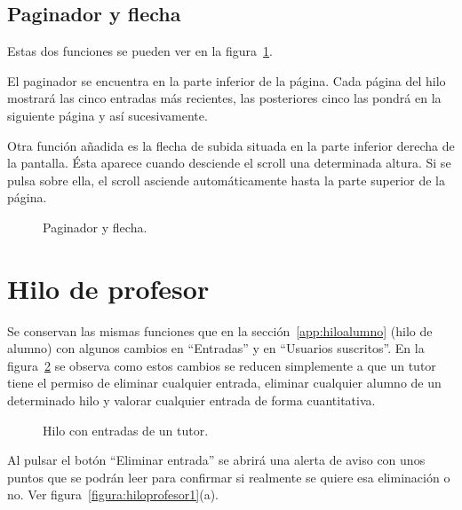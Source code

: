 \documentclass[a4paper, 12pt]{book}
\begin{document}
\subsection{Paginador y flecha}
Estas dos funciones se pueden ver en la figura~\ref{figura:hiloalumno5}.

El paginador se encuentra en la parte inferior de la p\'agina. Cada p\'agina del hilo mostrar\'a las cinco entradas m\'as recientes, las posteriores cinco 
las pondr\'a en la siguiente p\'agina y as\'i sucesivamente.

Otra funci\'on a\~nadida es la flecha de subida situada en la parte inferior derecha de la pantalla. \'Esta aparece cuando desciende el scroll una 
determinada altura. Si se pulsa sobre ella, el scroll asciende autom\'aticamente hasta la parte superior de la p\'agina.
\begin{figure}[htbp] 
  \centering
  \caption{Paginador y flecha.}
  \label{figura:hiloalumno5}
\end{figure}

\section{Hilo de profesor}
Se conservan las mismas funciones que en la secci\'on~\ref{app:hiloalumno} (hilo de alumno) con algunos cambios en ``Entradas'' y en ``Usuarios 
suscritos''. En la figura~\ref{figura:hiloprofesor} se observa como estos cambios se reducen simplemente a que un tutor tiene el permiso de eliminar 
cualquier entrada, eliminar cualquier alumno de un determinado hilo y valorar cualquier entrada de forma cuantitativa.
\begin{figure}[htbp] 
  \centering
  \caption{Hilo con entradas de un tutor.}
  \label{figura:hiloprofesor}
\end{figure}
Al pulsar el bot\'on ``Eliminar entrada'' se abrir\'a una alerta de aviso con unos puntos que se podr\'an leer para confirmar si realmente se quiere esa 
eliminaci\'on o no. Ver figura~\ref{figura:hiloprofesor1}(a).
\end{document}
